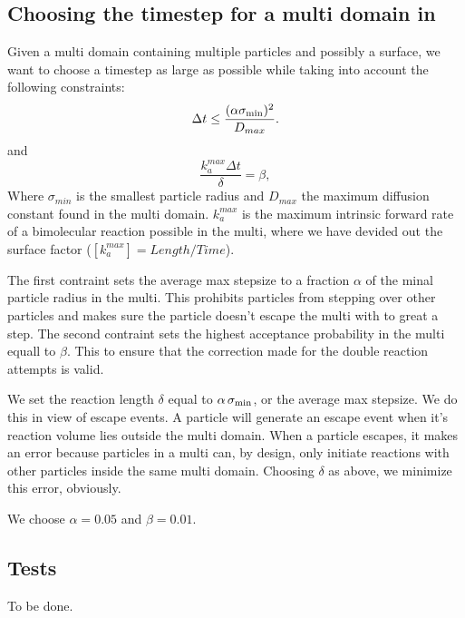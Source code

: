\subsection{Choosing the timestep for a multi domain in \GFRD}

Given a multi domain containing multiple particles and possibly a surface, we want to choose a timestep as large as possible while taking into account the following constraints:
\begin{equation}
 \Delta t \leq \frac{(\alpha \sigma_{\rm min})^2 }{D_{max}}.
\end{equation}
and
\begin{equation}
 \frac{k_{a}^{max} \Delta t}{\delta} = \beta,
\end{equation}
Where $\sigma_{min}$ is the smallest particle radius and $D_{max}$ the maximum diffusion constant found in the multi domain. $k_{a}^{max}$ is the maximum intrinsic forward rate of a bimolecular reaction possible in the multi, where we have devided out the surface factor ($[k_{a}^{max}] = Length/Time $).

The first contraint sets the average max stepsize to a fraction $\alpha$ of the minal particle radius in the multi. This prohibits particles from stepping over other particles and makes sure the particle doesn't escape the multi with to great a step. The second contraint sets the highest acceptance probability in the multi equall to $\beta$. This to ensure that the correction made for the double reaction attempts is valid. 

We set the reaction length $\delta$ equal to $\alpha \, \sigma_{\rm min}$, or the average max stepsize. We do this in view of escape events. A particle will generate an escape event when it's reaction volume lies outside the multi domain. When a particle escapes, it makes an error because particles in a multi can, by design, only initiate reactions with other particles inside the same multi domain. Choosing $\delta$ as above, we minimize this error, obviously.

We choose $\alpha = 0.05$ and $\beta = 0.01$.

\subsection{Tests}
To be done.
